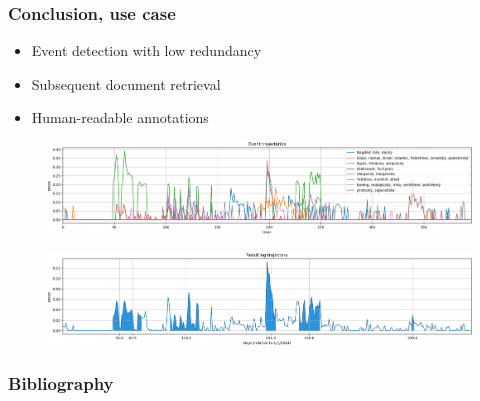 \documentclass{beamer}
\begin{document}
\begin{frame}
\frametitle{Conclusion, use case}

\begin{itemize}
\item Event detection with low redundancy
\item Subsequent document retrieval
\item Human-readable annotations
\end{itemize}

\begin{figure}
\centering
\includegraphics[width=\linewidth,height=\textheight,keepaspectratio]{crime_events_highlighted_trajectories}
\end{figure}

\begin{figure}
\centering
\includegraphics[width=\linewidth,height=\textheight,keepaspectratio]{crime_events_highlighted_averaged}
\end{figure}
\end{frame}


\begin{frame}[shrink=20,noframenumbering]
\frametitle{Bibliography}

\end{frame}
\end{document}
